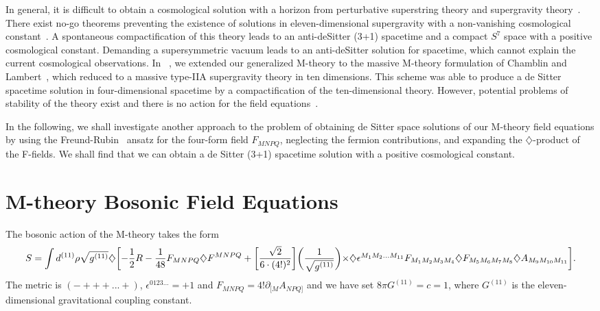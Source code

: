 \documentclass[a4paper,12pt]{article}
\begin{document}
In general, it is difficult to obtain a cosmological
solution with a horizon from perturbative superstring theory and
supergravity theory~\cite{Witten}. There exist no-go theorems preventing
the existence of solutions in eleven-dimensional supergravity with a
non-vanishing cosmological constant~\cite{Maldacena}. A spontaneous
compactification of this theory leads to an anti-deSitter (3+1) spacetime
and a compact $S^7$ space with a positive cosmological constant. Demanding
a supersymmetric vacuum leads to an anti-deSitter solution for spacetime,
which cannot explain the current cosmological observations. In
~\cite{Moffat}, we extended our generalized M-theory to the massive
M-theory formulation of Chamblin and Lambert~\cite{Lambert}, which reduced
to a massive type-IIA supergravity theory in ten dimensions. This scheme
was able to produce a de Sitter spacetime solution in four-dimensional
spacetime by a compactification of the ten-dimensional theory. However,
potential problems of stability of the theory exist and there is no action
for the field equations~\cite{Lambert2}.

In the following, we shall investigate another approach to the problem
of obtaining de Sitter space solutions of our M-theory field
equations by using the Freund-Rubin~\cite{Freund,Freund2} ansatz for the
four-form field $F_{MNPQ}$, neglecting the fermion contributions, and
expanding the $\diamondsuit$-product of the F-fields. We shall find that we
can obtain a de Sitter (3+1) spacetime solution with a positive
cosmological constant.

\section{\bf M-theory Bosonic Field Equations}

The bosonic action of the M-theory takes the form
\begin{equation}
S=\int
d^{(11)}\rho\sqrt{g^{(11)}}\diamondsuit\biggl[-\frac{1}{2}R-\frac{1}{48}F_{MNPQ}\diamondsuit
F^{MNPQ}+\biggl[\frac{\sqrt{2}}{6\cdot(4!)^2}\biggr]\biggl(\frac{1}{\sqrt{g^{(11)}}}\biggr)
$$ $$ \times\diamondsuit
\epsilon^{M_1M_2...M_{11}}F_{M_1M_2M_3M_4}\diamondsuit
F_{M_5M_6M_7M_8}\diamondsuit A_{M_9M_{10}M_{11}}\biggr].
\end{equation}
The metric is $(-+++...+)$, $\epsilon^{0123...}=+1$ and
$F_{MNPQ}=4!\partial_{[M}A_{NPQ]}$ and we have set $8\pi G^{(11)}=c=1$,
where $G^{(11)}$ is the eleven-dimensional gravitational coupling constant.
\end{document}
